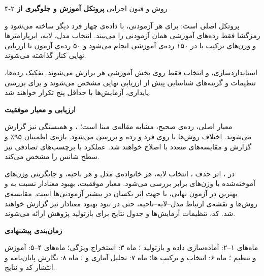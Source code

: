 \documentclass{ut-proposal}
\newcommand{\ProposalSubheading}[1]{\textcolor{UTBlue}{\textbf{#1}}}
\begin{document}
\begin{UTProposalSection}{۴-۲ روش و فنون اجرایی}
		\ProposalSubheading{پروتکل آموزش و جلوگیری از }

		پروتکل اصلی  است: برای هر آزمودنی،  با داده‌ی چهار فرد دیگر ساخته می‌شود و رمزگشا فقط رده‌های آموزشی همان آزمودنی را می‌بیند. انتخاب مدل، لایه، ابرپارامترها و وزن‌های ترکیب با  در ۱۵۰ رده‌ی آموزشی انجام می‌شود و ۵۰ رده‌ی آزمون تا ارزیابی نهایی کنار گذاشته می‌شوند.

		استانداردسازی،  و انتخاب  فقط روی بخش آموزشی هر  برازش می‌شوند. تفکیک رده‌ها، تنظیمات و گزینه‌های شناسایی پیش از ارزیابی نهایی مشخص می‌شوند و برای بررسی پایداری، آزمایش‌ها با حداقل پنج  تکرار خواهند شد.

		\ProposalSubheading{ارزیابی و معیار موفقیت}

		معیار اصلی،  رده‌ی صحیح، مشابه مقاله‌ی مبنا است؛ ،  و همبستگی  نیز گزارش می‌شوند. اختلاف روش‌ها با  روی فرد و رده و  بررسی می‌شود. بازه‌ی اطمینان ۹۵٪ و  گزارش و مقایسه‌های متعدد با  اصلاح خواهند شد. عملکرد با برچسب‌های تصادفی نیز سطح شانس را مشخص می‌کند.

		در ، اثر حذف ، انتخاب لایه، هر خانواده‌ی مدل و هر ناحیه، و جایگزینی وزن‌های آموخته‌شده با وزن‌های برابر بررسی می‌شود. معیار موفقیت، بهبود معنادار نسبت به  و بهترین  در آزمون نهایی، با جهت اثر یکسان در بیشتر آزمودنی‌ها است. مقایسه‌ی روش‌ها و نقشه‌ی ارتباط مدل–لایه–ناحیه، حتی در نبود بهبود معنادار نیز گزارش خواهند شد. کد، تنظیمات آزمایش‌ها و جدول نتایج برای بازتولید پژوهش ارائه می‌شوند.

		\ProposalSubheading{زمان‌بندی پیشنهادی}

		ماه‌های ۱–۲: آماده‌سازی داده و بازتولید ؛ ماه ۳: استخراج ویژگی؛ ماه‌های ۴–۵: آموزش و تنظیم ؛ ماه ۶: انتخاب و ترکیب ها؛ ماه ۷: تحلیل آماری و ؛ ماه ۸: نگارش پایان‌نامه و انتشار کد و نتایج.
	\end{UTProposalSection}
\end{document}

